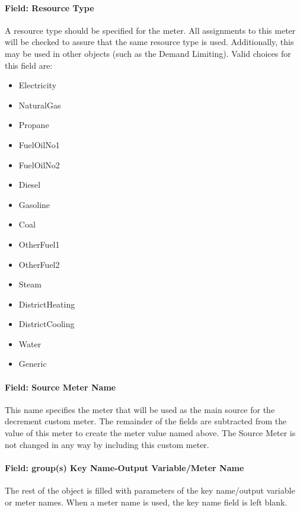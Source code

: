 \paragraph{Field: Resource Type}\label{field-fuel-type-1-003}

A resource type should be specified for the meter. All assignments to this meter will be checked to assure that the same resource type is used. Additionally, this may be used in other objects (such as the Demand Limiting). Valid choices for this field are:

\begin{itemize}
\item
  Electricity
\item
  NaturalGas
\item
  Propane
\item
  FuelOilNo1
\item
  FuelOilNo2
\item
  Diesel
\item
  Gasoline
\item
  Coal
\item
  OtherFuel1
\item
  OtherFuel2
\item
  Steam
\item
  DistrictHeating
\item
  DistrictCooling
\item
  Water
\item
  Generic
\end{itemize}

\paragraph{Field: Source Meter Name}\label{field-source-meter-name}

This name specifies the meter that will be used as the main source for the decrement custom meter. The remainder of the fields are subtracted from the value of this meter to create the meter value named above. The Source Meter is not changed in any way by including this custom meter.

\paragraph{Field: group(s) Key Name-Output Variable/Meter Name}\label{field-groups-key-name-output-variablemeter-name-1}

The rest of the object is filled with parameters of the key name/output variable or meter names. When a meter name is used, the key name field is left blank.

